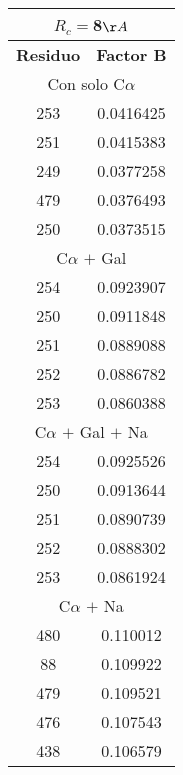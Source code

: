 \begin{tabular}[c]{|c|c|}
\multicolumn{2}{c}{$R_c=$8$\AA$}\\\hline
\textbf{Residuo}&\textbf{Factor B}\\\hline
\multicolumn{2}{c}{Con solo C$\alpha$}\\\hline
       253& 0.0416425\\
       251& 0.0415383\\
       249& 0.0377258\\
       479& 0.0376493\\
       250& 0.0373515\\\hline
\multicolumn{2}{c}{C$\alpha$ $+$ Gal}\\\hline
       254& 0.0923907\\
       250& 0.0911848\\
       251& 0.0889088\\
       252& 0.0886782\\
       253& 0.0860388\\\hline
\multicolumn{2}{c}{C$\alpha$ $+$ Gal $+$ Na}\\\hline
       254& 0.0925526\\
       250& 0.0913644\\
       251& 0.0890739\\
       252& 0.0888302\\
       253& 0.0861924\\\hline
\multicolumn{2}{c}{C$\alpha$ $+$ Na}\\\hline
       480&  0.110012\\
        88&  0.109922\\
       479&  0.109521\\
       476&  0.107543\\
       438&  0.106579\\\hline
\end{tabular}
